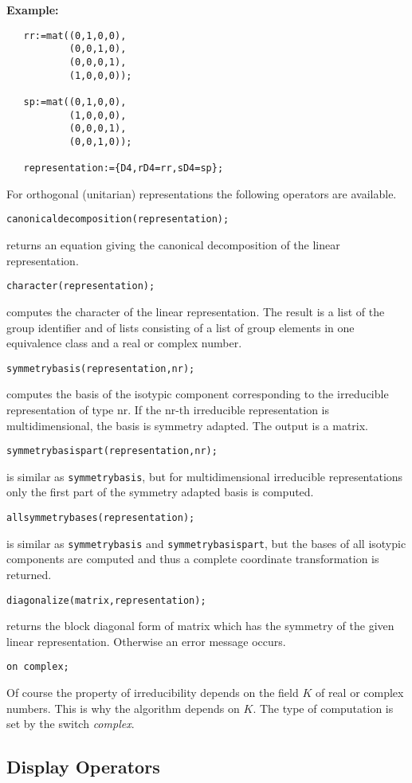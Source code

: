 {\bf Example:}
\begin{verbatim}
   rr:=mat((0,1,0,0),
           (0,0,1,0),
           (0,0,0,1),
           (1,0,0,0));

   sp:=mat((0,1,0,0),
           (1,0,0,0),
           (0,0,0,1),
           (0,0,1,0));

   representation:={D4,rD4=rr,sD4=sp};
\end{verbatim}

For orthogonal (unitarian) representations the following operators
are available.

{\tt canonicaldecomposition(representation);}

returns an equation giving the canonical decomposition of the linear
representation.

{\tt character(representation);}

computes the character of the linear representation. The result is a list
of the group identifier and of lists consisting of a
list of group elements in one equivalence class and a real or complex number.

{\tt symmetrybasis(representation,nr);}

computes the basis of the isotypic component corresponding to the irreducible
representation of type nr. If the nr-th irreducible representation is
multidimensional, the basis is symmetry adapted. The output is a matrix.

{\tt symmetrybasispart(representation,nr);}

is similar as {\tt symmetrybasis}, but for multidimensional
irreducible representations only the first part of the
symmetry adapted basis is computed.

{\tt allsymmetrybases(representation);}

is similar as {\tt symmetrybasis} and {\tt symmetrybasispart},
but the bases of all
isotypic components are computed and thus a
complete coordinate transformation is returned.

{\tt diagonalize(matrix,representation);}

returns the block diagonal form of matrix which has the symmetry
of the given linear representation. Otherwise an error message occurs.

{\tt on complex;}

Of course the property of irreducibility depends on the field $K$ of
real or complex numbers. This is why the algorithm depends on $K$.
The type of computation is set by the switch {\em complex}.

\subsection{Display Operators}

